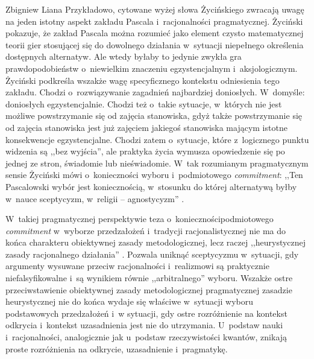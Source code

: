 \begin{artplenv}{Zbigniew Liana}
Przykładowo, cytowane wyżej słowa Życińskiego zwracają uwagę na jeden istotny aspekt zakładu Pascala i~racjonalności pragmatycznej. Życiński pokazuje, że zakład Pascala można rozumieć jako element czysto matematycznej teorii gier stosującej się do dowolnego działania w~sytuacji niepełnego określenia dostępnych alternatyw. Ale wtedy byłaby to jedynie zwykła gra prawdopodobieństw o~niewielkim znaczeniu egzystencjalnym i~aksjologicznym. Życiński podkreśla wszakże wagę specyficznego kontekstu odniesienia tego zakładu. Chodzi o~rozwiązywanie zagadnień najbardziej doniosłych. W~domyśle: doniosłych egzystencjalnie. Chodzi też o~takie sytuacje, w~których nie jest możliwe powstrzymanie się od zajęcia stanowiska, gdyż także powstrzymanie się od zajęcia stanowiska jest już zajęciem jakiegoś stanowiska mającym istotne konsekwencje egzystencjalne. Chodzi zatem o~sytuacje, które z~logicznego punktu widzenia są ,,bez wyjścia'', ale praktyka życia wymusza opowiedzenie się po jednej ze stron, świadomie lub nieświadomie. W~tak rozumianym pragmatycznym sensie Życiński mówi o~konieczności wyboru i~podmiotowego \textit{commitment}: ,,Ten Pascalowski wybór jest koniecznością, w~stosunku do której alternatywą byłby w~nauce sceptycyzm, w~religii -- agnostycyzm''
\parencite[][s.~230]{zycinski_teizm_1985}.%


W~takiej pragmatycznej perspektywie teza o~koniecznościpodmiotowego \textit{commitment} w~wyborze przedzałożeń i~tradycji racjonalistycznej nie ma do końca charakteru obiektywnej zasady metodologicznej, lecz raczej ,,heurystycznej zasady racjonalnego działania''
\parencite[][s.~211]{zycinski_teizm_1985}. %
 Pozwala uniknąć sceptycyzmu w~sytuacji, gdy argumenty wysuwane przeciw racjonalności i~realizmowi są praktycznie niefalsyfikowalne i~są wynikiem równie ,,arbitralnego'' wyboru. Wszakże ostre przeciwstawienie obiektywnej zasady metodologicznej pragmatycznej zasadzie heurystycznej nie do końca wydaje się właściwe w~sytuacji wyboru podstawowych przedzałożeń i~w sytuacji, gdy ostre rozróżnienie na kontekst odkrycia i~kontekst uzasadnienia jest nie do utrzymania. U~podstaw nauki i~racjonalności, analogicznie jak u~podstaw rzeczywistości kwantów, znikają proste rozróżnienia na odkrycie, uzasadnienie i~pragmatykę.


\end{artplenv}
